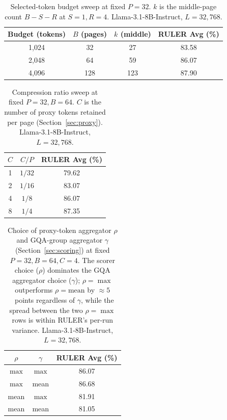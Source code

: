 \begin{table}[ht]
  \centering
  \caption[Ablation: selected-token budget.]
  {Selected-token budget sweep at fixed $P{=}32$.  $k$ is the
   middle-page count $B - S - R$ at $S{=}1, R{=}4$.
   Llama-3.1-8B-Instruct, $L = 32{,}768$.}
  \label{tab:abl-budget}
  \small
  \begin{tabular}{c c c c}
    \toprule
    Budget (tokens) & $B$ (pages) & $k$ (middle) & RULER Avg (\%) \\
    \midrule
    1{,}024 &  32 & 27  & 83.58 \\
    2{,}048 &  64 & 59  & 86.07 \\
    4{,}096 & 128 & 123 & 87.90 \\
    \bottomrule
  \end{tabular}
\end{table}

\begin{table}[ht]
  \centering
  \caption[Ablation: compression ratio $C/P$.]
  {Compression ratio sweep at fixed $P{=}32, B{=}64$.  $C$ is the
   number of proxy tokens retained per page (Section~\ref{sec:proxy}).
   Llama-3.1-8B-Instruct, $L = 32{,}768$.}
  \label{tab:abl-compress}
  \small
  \begin{tabular}{c c c}
    \toprule
    $C$ & $C/P$ & RULER Avg (\%) \\
    \midrule
    1 & $1/32$ & 79.62 \\
    2 & $1/16$ & 83.07 \\
    4 & $1/8$  & 86.07 \\
    8 & $1/4$  & 87.35 \\
    \bottomrule
  \end{tabular}
\end{table}

\begin{table}[ht]
  \centering
  \caption[Ablation: scoring and GQA-group aggregators.]
  {Choice of proxy-token aggregator $\rho$ and GQA-group aggregator
   $\gamma$ (Section~\ref{sec:scoring}) at fixed
   $P{=}32, B{=}64, C{=}4$.  The scorer choice ($\rho$) dominates
   the GQA aggregator choice ($\gamma$); $\rho{=}\max$ outperforms
   $\rho{=}\mathrm{mean}$ by $\approx 5$~points regardless of
   $\gamma$, while the spread between the two $\rho{=}\max$ rows is
   within RULER's per-run variance.
   Llama-3.1-8B-Instruct, $L = 32{,}768$.}
  \label{tab:abl-aggregators}
  \small
  \begin{tabular}{c c c}
    \toprule
    $\rho$ & $\gamma$ & RULER Avg (\%) \\
    \midrule
    $\max$  & $\max$  & 86.07 \\
    $\max$  & mean    & 86.68 \\
    mean    & $\max$  & 81.91 \\
    mean    & mean    & 81.05 \\
    \bottomrule
  \end{tabular}
\end{table}
